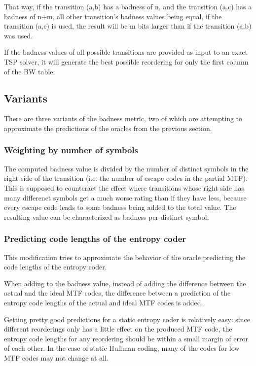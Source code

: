\documentclass[a4paper]{scrreprt}
\begin{document}
That way, if the transition (a,b) has a badness of n, and the transition (a,c)
has a badness of n+m, all other transition's badness values being equal, if the
transition (a,c) is used, the result will be m bits larger than if the
transition (a,b) was used.

If the badness values of all possible transitions are provided as input to an
exact TSP solver, it will generate the best possible reordering for only the
first column of the BW table.

\subsection{Variants}

There are three variants of the badness metric, two of which are attempting to
approximate the predictions of the oracles from the previous section.

\subsubsection{Weighting by number of symbols}

The computed badness value is divided by the number of distinct symbols in the
right side of the transition (i.e. the number of escape codes in the partial
MTF). This is supposed to counteract the effect where transitions whose right
side has many differenct symbols get a much worse rating than if they have less,
because every escape code leads to some badness being added to the total value.
The resulting value can be characterized as badness per distinct symbol.

\subsubsection{Predicting code lengths of the entropy coder}

This modification tries to approximate the behavior of the oracle predicting the
code lengths of the entropy coder.

When adding to the badness value, instead of adding the difference between the
actual and the ideal MTF codes, the difference between a prediction of the
entropy code lengths of the actual and ideal MTF codes is added.

Getting pretty good predictions for a static entropy coder is relatively easy:
since different reorderings only has a little effect on the produced MTF code,
the entropy code lengths for any reordering should be within a small margin of
error of each other. In the case of static Huffman coding, many of the codes for
low MTF codes may not change at all.
\end{document}
